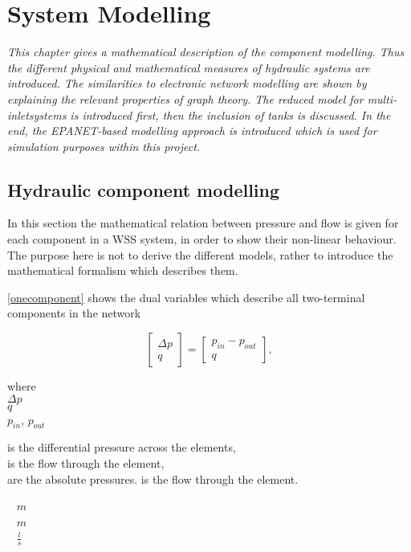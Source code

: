 \chapter{System Modelling}
\label{system_modelling}

\emph{This chapter gives a mathematical description of the component modelling. Thus the different physical and mathematical measures of hydraulic systems are introduced. The similarities to electronic network modelling are shown by explaining the relevant properties of graph theory. The reduced model for multi-inletsystems is introduced first, then the inclusion of tanks is discussed. In the end, the EPANET-based modelling approach is introduced which is used for simulation purposes within this project.}

\section{Hydraulic component modelling}
\label{hydraulic_component_modelling}

In this section the mathematical relation between pressure and flow is given for each component in a WSS system, in order to show their non-linear behaviour. The purpose here is not to derive the different models, rather to introduce the mathematical formalism which describes them.

\eqref{onecomponent} shows the dual variables which describe all two-terminal components in the network 

\begin{equation}
\label{onecomponent}
 \begin{bmatrix}
    \Delta p \\
    q
\end{bmatrix}
=
 \begin{bmatrix}
    p_{in} - p_{out} \\
    q
\end{bmatrix},
\end{equation}

 \begin{minipage}[t]{0.20\textwidth}
where\\
\hspace*{8mm} $\Delta p$ \\
\hspace*{8mm} $q$ \\
\hspace*{8mm} $p_{in}$, $p_{out}$ 
\end{minipage}
\begin{minipage}[t]{0.68\textwidth}
\vspace*{2mm}
is the differential pressure across the elements,\\
is the flow through the element,\\
are the absolute pressures.
is the flow through the element.
\end{minipage}
\begin{minipage}[t]{0.10\textwidth}
\vspace*{2mm}
\textcolor{White}{te}$\unit{m}$\\
\textcolor{White}{te}$\unit{m}$\\
\textcolor{White}{te}$\unit{\frac{l}{s}}$
\end{minipage}

